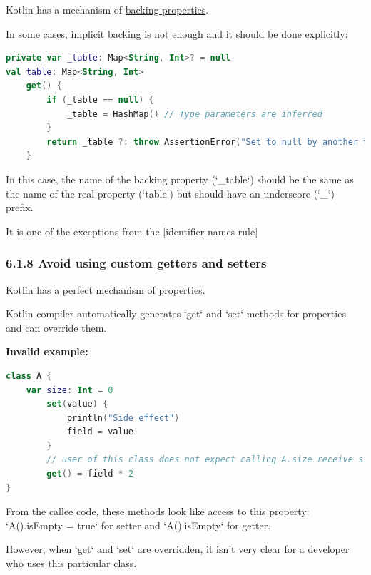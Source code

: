 {{{{\label{sec:6.1.7}

Kotlin has a mechanism of \href{https://kotlinlang.org/docs/reference/properties.html#backing-properties}{backing properties}.

In some cases, implicit backing is not enough and it should be done explicitly:

\begin{lstlisting}[language=Kotlin]
private var _table: Map<String, Int>? = null
val table: Map<String, Int>
    get() {
        if (_table == null) {
            _table = HashMap() // Type parameters are inferred
        }
        return _table ?: throw AssertionError("Set to null by another thread")
    }
\end{lstlisting}


In this case, the name of the backing property (`_table`) should be the same as the name of the real property (`table`) but should have an underscore (`_`) prefix.

It is one of the exceptions from the [identifier names rule]



\subsubsection*{\textbf{6.1.8 Avoid using custom getters and setters}}
\leavevmode\newline

\label{sec:6.1.8}

Kotlin has a perfect mechanism of \href{https://kotlinlang.org/docs/reference/properties.html#properties-and-fields}{properties}.

Kotlin compiler automatically generates `get` and `set` methods for properties and can override them.



\textbf{Invalid example:}

\begin{lstlisting}[language=Kotlin]
class A {
    var size: Int = 0
        set(value) {
            println("Side effect")
            field = value
        }
        // user of this class does not expect calling A.size receive size * 2 
        get() = field * 2
}
\end{lstlisting}


From the callee code, these methods look like access to this property: `A().isEmpty = true` for setter and `A().isEmpty` for getter.



However, when `get` and `set` are overridden, it  isn't very clear for a developer who uses this particular class. 

}}}}
